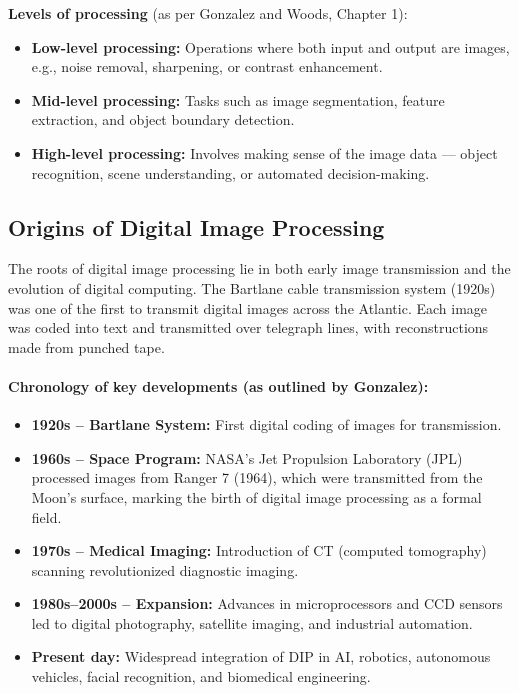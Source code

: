 \documentclass[12pt,a4paper]{AnantDocumentation}
\begin{document}
\textbf{Levels of processing} (as per Gonzalez and Woods, Chapter 1):
\begin{itemize}
\item \textbf{Low-level processing:} Operations where both input and output are images, e.g., noise removal, sharpening, or contrast enhancement.
\item \textbf{Mid-level processing:} Tasks such as image segmentation, feature extraction, and object boundary detection.
\item \textbf{High-level processing:} Involves making sense of the image data — object recognition, scene understanding, or automated decision-making.
\end{itemize}

\subsection{Origins of Digital Image Processing}
The roots of digital image processing lie in both early image transmission and the evolution of digital computing. The Bartlane cable transmission system (1920s) was one of the first to transmit digital images across the Atlantic. Each image was coded into text and transmitted over telegraph lines, with reconstructions made from punched tape.

\paragraph{Chronology of key developments (as outlined by Gonzalez):}
\begin{itemize}
\item \textbf{1920s – Bartlane System:} First digital coding of images for transmission.
\item \textbf{1960s – Space Program:} NASA’s Jet Propulsion Laboratory (JPL) processed images from Ranger 7 (1964), which were transmitted from the Moon’s surface, marking the birth of digital image processing as a formal field.
\item \textbf{1970s – Medical Imaging:} Introduction of CT (computed tomography) scanning revolutionized diagnostic imaging.
\item \textbf{1980s–2000s – Expansion:} Advances in microprocessors and CCD sensors led to digital photography, satellite imaging, and industrial automation.
\item \textbf{Present day:} Widespread integration of DIP in AI, robotics, autonomous vehicles, facial recognition, and biomedical engineering.
\end{itemize}
\end{document}

